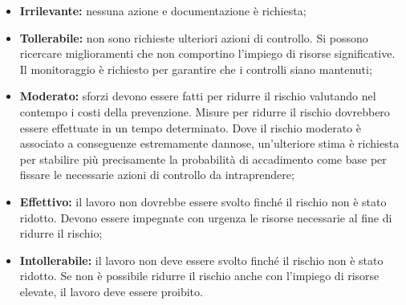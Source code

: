 \begin{itemize}
	\item \textbf{Irrilevante:} nessuna azione e documentazione è richiesta;
	
\item \textbf{Tollerabile:} non sono richieste ulteriori azioni di controllo. Si possono ricercare miglioramenti che non comportino l'impiego di risorse significative. Il monitoraggio è richiesto per garantire che i controlli siano mantenuti;		
	\item \textbf{Moderato:} sforzi devono essere fatti per ridurre il rischio valutando nel contempo i costi della prevenzione. Misure per ridurre il rischio dovrebbero essere effettuate in un tempo determinato. Dove il rischio moderato è associato a conseguenze estremamente dannose, un'ulteriore stima è richiesta per stabilire più precisamente la probabilità di accadimento come base per fissare le necessarie azioni di controllo da intraprendere;
	
\item \textbf{Effettivo:} il lavoro non dovrebbe essere svolto finché il rischio non è stato ridotto. Devono essere impegnate con urgenza le risorse necessarie al fine di ridurre il rischio;
	
\item \textbf{Intollerabile:} il lavoro non deve essere svolto finché il rischio non è stato ridotto. Se non è possibile ridurre il rischio anche con l'impiego di risorse elevate, il lavoro deve essere proibito.
\end{itemize}

